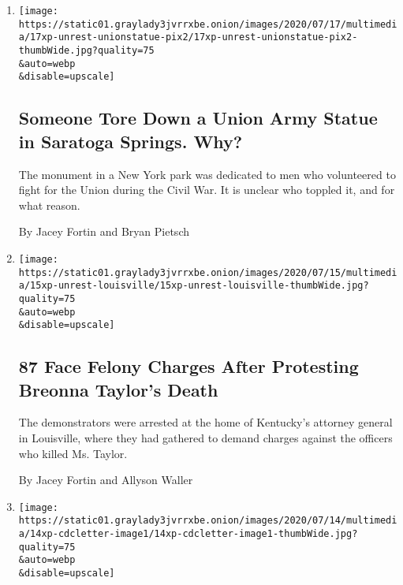 \begin{enumerate}
\def\labelenumi{\arabic{enumi}.}
\item
  \href{/2020/07/18/us/union-statue-saratoga-springs-ny.html}{}

  \texttt{[image: https://static01.graylady3jvrrxbe.onion/images/2020/07/17/multimedia/17xp-unrest-unionstatue-pix2/17xp-unrest-unionstatue-pix2-thumbWide.jpg?quality=75\\\&auto=webp\\\&disable=upscale]}

  \hypertarget{someone-tore-down-a-union-army-statue-in-saratoga-springs-why}{%
  \subsection{Someone Tore Down a Union Army Statue in Saratoga Springs.
  Why?}\label{someone-tore-down-a-union-army-statue-in-saratoga-springs-why}}

  The monument in a New York park was dedicated to men who volunteered
  to fight for the Union during the Civil War. It is unclear who toppled
  it, and for what reason.

  By Jacey Fortin and Bryan Pietsch
\item
  \href{/2020/07/15/us/protesters-arrested-breonna-taylor-kentucky.html}{}

  \texttt{[image: https://static01.graylady3jvrrxbe.onion/images/2020/07/15/multimedia/15xp-unrest-louisville/15xp-unrest-louisville-thumbWide.jpg?quality=75\\\&auto=webp\\\&disable=upscale]}

  \hypertarget{87-face-felony-charges-after-protesting-breonna-taylors-death}{%
  \subsection{87 Face Felony Charges After Protesting Breonna Taylor's
  Death}\label{87-face-felony-charges-after-protesting-breonna-taylors-death}}

  The demonstrators were arrested at the home of Kentucky's attorney
  general in Louisville, where they had gathered to demand charges
  against the officers who killed Ms. Taylor.

  By Jacey Fortin and Allyson Waller
\item
  \href{/2020/07/14/us/politics/CDC-racism-black-employees.html}{}

  \texttt{[image: https://static01.graylady3jvrrxbe.onion/images/2020/07/14/multimedia/14xp-cdcletter-image1/14xp-cdcletter-image1-thumbWide.jpg?quality=75\\\&auto=webp\\\&disable=upscale]}


\end{enumerate}
